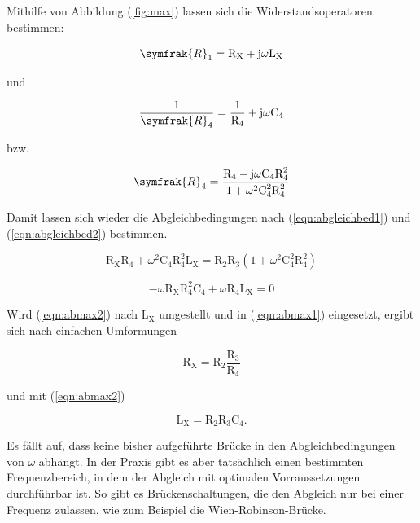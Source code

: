 \noindent
Mithilfe von Abbildung (\ref{fig:max}) lassen sich die Widerstandsoperatoren bestimmen:

\begin{equation}
\symfrak{R}_1= \text{R}_\text{X}+\text{j} \omega \text{L}_\text{X}
\end{equation}

\noindent
und

\begin{equation}
\frac{1}{\symfrak{R}_4}= \frac{1}{\text{R}_4}+\text{j} \omega \text{C}_4
\end{equation}

\noindent
bzw.

\begin{equation}
\symfrak{R}_4 = \frac{\text{R}_4 - \text{j} \omega \text{C}_4 \text{R}_4^2}{1 + \omega^2 \text{C}_4^2 \text{R}_4^2}
\end{equation}

\noindent
Damit lassen sich wieder die Abgleichbedingungen nach (\ref{eqn:abgleichbed1}) und (\ref{eqn:abgleichbed2}) bestimmen.

\begin{equation}
\text{R}_\text{X} \text{R}_4 + \omega^2 \text{C}_4 \text{R}_4^2 \text{L}_\text{X} = \text{R}_2 \text{R}_3 (1 + \omega^2 \text{C}_4^2 \text{R}_4^2)
\label{eqn:abmax1}
\end{equation}

\begin{equation}
- \omega \text{R}_\text{X} \text{R}_4^2 \text{C}_4 + \omega \text{R}_4 \text{L}_\text{X} = 0
\label{eqn:abmax2}
\end{equation}

\noindent
Wird (\ref{eqn:abmax2}) nach $\text{L}_\text{X}$ umgestellt und in (\ref{eqn:abmax1}) eingesetzt, ergibt sich nach einfachen Umformungen

\begin{equation}
\text{R}_\text{X} = \text{R}_2 \frac{\text{R}_3}{\text{R}_4}
\end{equation}

\noindent
und mit (\ref{eqn:abmax2}) 

\begin{equation}
\text{L}_\text{X} = \text{R}_2 \text{R}_3 \text{C}_4   .
\label{eqn:l_xM}
\end{equation}

\noindent
Es fällt auf, dass keine bisher aufgeführte Brücke in den Abgleichbedingungen von $\omega$ abhängt.
In der Praxis gibt es aber tatsächlich einen bestimmten Frequenzbereich, in dem der Abgleich mit optimalen Vorraussetzungen durchführbar ist.
So gibt es Brückenschaltungen, die den Abgleich nur bei einer Frequenz zulassen, wie zum Beispiel die Wien-Robinson-Brücke.

